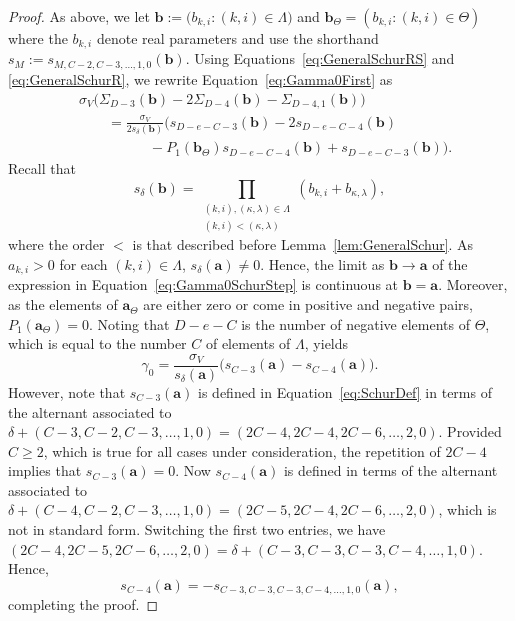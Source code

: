\documentclass{amsart}
\theoremstyle{definition}
\theoremstyle{remark}
\newcommand{\bs}{\boldsymbol}
\begin{document}
\begin{proof}
As above, we let
$\bs{b} := \big(b_{k,i} : (k,i)\in\Lambda\big)$ and
$\bs{b}_\Theta = ( b_{k,i} : (k,i)\in\Theta)$
where the $b_{k,i}$ denote real parameters and use the shorthand
$s_M := s_{M,C-2,C-3, \ldots, 1, 0}(\bs{b})$.
Using Equations~\eqref{eq:GeneralSchurRS} and \eqref{eq:GeneralSchurR},
we rewrite Equation~\eqref{eq:Gamma0First} as
\begin{align}
    \label{eq:Gamma0SchurStep}
    &\sigma_V \Big( \Sigma_{D-3}(\bs{b}) - 2 \Sigma_{D-4}(\bs{b}) - \Sigma_{D-4,1}(\bs{b}) \Big)
    \\ \nonumber &\quad\quad=
    \frac{\sigma_V}{2 s_\delta(\bs{b})} \Big(
        s_{D-e-C-3}(\bs{b})
        -
        2 s_{D-e-C-4}(\bs{b})
    \\ \nonumber
    &\quad\quad\quad\quad\quad
        -
        P_1(\bs{b}_\Theta) s_{D-e-C-4}(\bs{b})
        + s_{D-e-C-3}(\bs{b})
    \Big).
\end{align}
Recall that
\[
    s_\delta(\bs{b})
    =   \prod\limits_{\substack{(k,i),(\kappa,\lambda)\in\Lambda \\ (k,i) < (\kappa,\lambda) }}
            (b_{k,i} + b_{\kappa,\lambda}),
\]
where the order $<$ is that described before Lemma~\ref{lem:GeneralSchur}. As $a_{k,i} > 0$
for each $(k,i)\in\Lambda$, $s_\delta(\bs{a})\neq 0$. Hence, the limit as $\bs{b}\to\bs{a}$
of the expression in Equation~\eqref{eq:Gamma0SchurStep} is continuous at $\bs{b} = \bs{a}$.
Moreover, as the elements of $\bs{a}_\Theta$ are either zero or come in positive and negative
pairs, $P_1(\bs{a}_{\Theta}) = 0$. Noting that $D-e-C$ is the number of negative elements of $\Theta$, which is equal to the number $C$ of elements of $\Lambda$, yields
\[
    \gamma_0
    =
    \frac{\sigma_V}{s_\delta(\bs{a})} \Big(
        s_{C-3}(\bs{a}) - s_{C-4}(\bs{a})
    \Big).
\]
However, note that $s_{C-3}(\bs{a})$ is defined in Equation~\eqref{eq:SchurDef}
in terms of the alternant associated to $\delta+(C-3,C-2,C-3,\ldots,1,0) = (2C-4, 2C-4, 2C-6,\ldots,2,0)$.
Provided $C\geq 2$, which is true for all cases under consideration, the repetition of $2C-4$ implies that
$s_{C-3}(\bs{a}) = 0$. Now $s_{C-4}(\bs{a})$ is defined in terms of the
alternant associated to $\delta+(C-4,C-2,C-3,\ldots,1,0) = (2C-5, 2C-4, 2C-6,\ldots,2,0)$, which is not
in standard form. Switching the first two entries, we have
$(2C-4, 2C-5, 2C-6,\ldots,2,0) = \delta+(C-3, C-3, C-3, C-4,\ldots,1,0)$. Hence,
\begin{equation}
\label{eq:SchurC3}
    s_{C-4}(\bs{a})
    =
    - s_{C-3,C-3,C-3,C-4,\ldots,1,0}(\bs{a}),
\end{equation}
completing the proof.
\end{proof}
\end{document}
